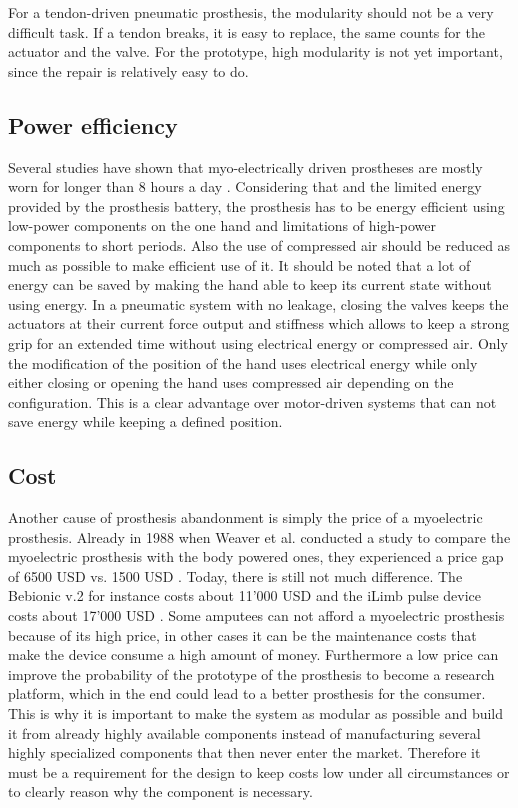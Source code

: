 \documentclass[main]{subfiles}
\begin{document}
For a tendon-driven pneumatic prosthesis, the modularity should not be a very difficult task. If a tendon breaks, it is easy to replace, the same counts for the actuator and the valve. For the prototype, high modularity is not yet important, since the repair is relatively easy to do.

\subsection{Power efficiency}
Several studies have shown that myo-electrically driven prostheses are mostly worn for longer than 8 hours a day \cite{Fraser1998,Crandall2002,Silcox1993,Northmore1980,Hubbard1997,Kyberd1993,Millstein1986,Datta1989,Weaver1988,Keijlaa1993,Scotland1983}. Considering that and the limited energy provided by the prosthesis battery, the prosthesis has to be energy efficient using low-power components on the one hand and limitations of high-power components to short periods. Also the use of compressed air should be reduced as much as possible to make efficient use of it. It should be noted that a lot of energy can be saved by making the hand able to keep its current state without using energy. In a pneumatic system with no leakage, closing the valves keeps the actuators at their current force output and stiffness which allows to keep a strong grip for an extended time without using electrical energy or compressed air. Only the modification of the position of the hand uses electrical energy while only either closing or opening the hand uses compressed air depending on the configuration. This is a clear advantage over motor-driven systems that can not save energy while keeping a defined position. 

\subsection{Cost}
Another cause of prosthesis abandonment is simply the price of a myoelectric prosthesis. Already in 1988 when Weaver et al. conducted a study to compare the myoelectric prosthesis with the body powered ones, they experienced a price gap of 6500 USD vs. 1500 USD \cite{Weaver1988}. Today, there is still not much difference.
The Bebionic v.2 for instance costs about 11'000 USD \cite{wwwrslsteeper} and the iLimb pulse device costs about 17'000 USD \cite{wwwtouchbionics}. Some amputees can not afford a myoelectric prosthesis because of its high price, in other cases it can be the maintenance costs that make the device consume a high amount of money. Furthermore a low price can improve the probability of the prototype of the prosthesis to become a research platform, which in the end could lead to a better prosthesis for the consumer. This is why it is important to make the system as modular as possible and build it from already highly available components instead of manufacturing several highly specialized components that then never enter the market. Therefore it must be a requirement for the design to keep costs low under all circumstances or to clearly reason why the component is necessary.\\
\end{document}

